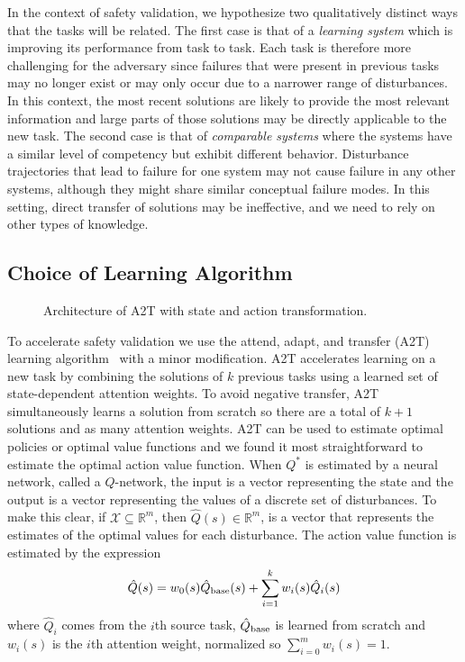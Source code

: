 In the context of safety validation, we hypothesize two qualitatively distinct ways that the tasks will be related. The first case is that of a \emph{learning system} which is improving its performance from task to task. Each task is therefore more challenging for the adversary since failures that were present in previous tasks may no longer exist or may only occur due to a narrower range of disturbances. In this context, the most recent solutions are likely to provide the most relevant information and large parts of those solutions may be directly applicable to the new task. The second case is that of \emph{comparable systems} where the systems have a similar level of competency but exhibit different behavior. Disturbance trajectories that lead to failure for one system may not cause failure in any other systems, although they might share similar conceptual failure modes. In this setting, direct transfer of solutions may be ineffective, and we need to rely on other types of knowledge. 


\subsection{Choice of Learning Algorithm}
\begin{figure}
\centering
\resizebox{0.7\columnwidth}{!}{}
\caption{Architecture of A2T with state and action transformation.}
\label{fig:a2t_architecture}
\end{figure}

To accelerate safety validation we use the attend, adapt, and transfer (A2T) learning algorithm~\cite{rajendran2017attend} with a minor modification. A2T accelerates learning on a new task by combining the solutions of $k$ previous tasks using a learned set of state-dependent attention weights. To avoid negative transfer, A2T simultaneously learns a solution from scratch so there are a total of $k+1$ solutions and as  many attention weights. A2T can be used to estimate optimal policies or optimal value functions and we found it most straightforward to estimate the optimal action value function. When $Q^*$ is estimated by a neural network, called a $Q$-network, the input is a vector representing the state and the output is a vector representing the values of a discrete set of disturbances. To make this clear, if $\mathcal{X} \subseteq \mathbb{R}^m$, then $\hat{Q}(s) \in \mathbb{R}^m$, is a vector that represents the estimates of the optimal values for each disturbance. The action value function is estimated by the expression
\begin{equation}
\hat{Q}(s) = w_0(s) \hat{Q}_{\rm base}(s) + \sum_{i=1}^k w_i(s) \hat{Q}_i(s) \label{eq:A2T}
\end{equation}
where $\hat{Q}_i$ comes from the $i$th source task, $\hat{Q}_{\rm base}$ is learned from scratch and $w_i(s)$ is the $i$th attention weight, normalized so $\sum_{i=0}^m w_i(s) = 1$.



